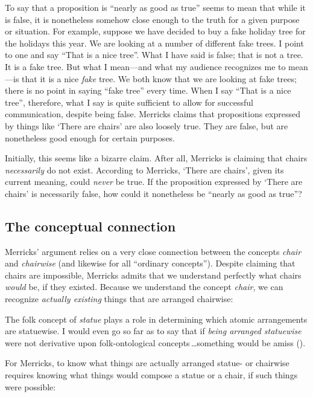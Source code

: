 \documentclass[12pt,twoside]{reedfancy}
\newenvironment{squote}{%
	\begin{spacing}{1}
	\begin{list}{}{%
	\setlength{\labelwidth}{0pt}%
	\rightmargin\leftmargin%
	}
	\item\relax
	}{%
	\end{list}%
	\end{spacing}
	}
\begin{document}
\begin{spacing}{1.25}
To say that a proposition is ``nearly as good as true'' seems to mean
that while it is false, it is nonetheless somehow close enough to the
truth for a given purpose or situation.  For example, suppose we have
decided to buy a fake holiday tree for the holidays this year.  We are
looking at a number of different fake trees.  I point to one and say
``That is a nice tree''.  What I have said is false; that is not a
tree.  It is a fake tree.  But what I mean---and what my audience
recognizes me to mean---is that it is a nice {\em fake} tree.  We both
know that we are looking at fake trees; there is no point in saying
``fake tree'' every time.  When I say ``That is a nice tree'',
therefore, what I say is quite sufficient to allow for successful
communication, despite being false.  Merricks claims that propositions
expressed by things like `There are chairs' are also loosely true.
They are false, but are nonetheless good enough for certain purposes.

Initially, this seems like a bizarre claim.  After all, Merricks is
claiming that chairs {\em necessarily} do not exist.  According to
Merricks, `There are chairs', given its current meaning, could {\em
  never} be true.  If the proposition expressed by `There are chairs'
is necessarily false, how could it nonetheless be ``nearly as good as
true''?

\subsection{The conceptual connection}
\label{connection}
Merricks' argument relies on a very close connection between the
concepts {\em chair} and {\em chairwise} (and likewise for all
``ordinary concepts'').  Despite claiming that chairs are impossible,
Merricks admits that we understand perfectly what chairs {\em would}
be, if they existed.  Because we understand the concept {\em chair},
we can recognize {\em actually existing} things that are arranged
chairwise:

\begin{squote}
The folk concept of \emph{statue} plays a role in determining which
atomic arrangements are statuewise. I would even go so far as to say
that if \emph{being arranged statuewise} were not derivative upon
folk-ontological concepts\,\ldots something would be amiss
(\citeyear[8]{merricks2001a}).
\end{squote}

For Merricks, to know what things are actually arranged statue- or
chairwise requires knowing what things would compose a statue or a
chair, if such things were possible:


\end{spacing}
\end{document}
